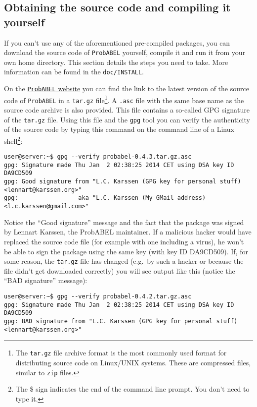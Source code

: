 \documentclass[12pt,a4paper]{article}
\newcommand{\PA}{\texttt{ProbABEL}}
\begin{document}
\subsection{Obtaining the source code and compiling it yourself}
\label{sec:obtain}
If you can't use any of the aforementioned pre-compiled packages, you
can download the source code of \PA{} yourself, compile it and run it
from your own home directory. This section details the steps you need
to take. More information can be found in the \texttt{doc/INSTALL}.

On the \href{http://www.genabel.org/packages/probabel}{\PA{} website}
you can find the link to the latest version of the source code of \PA{}
in a \texttt{tar.gz} file\footnote{The \texttt{tar.gz} file archive
  format is the most commonly used format for distributing source code
  on Linux/UNIX systems. These are compressed files, similar to
  \texttt{zip} files.}. A \texttt{.asc} file with the same base name
as the source code archive is also provided. This file contains a
so-called GPG signature of the \texttt{tar.gz} file. Using this file
and the \texttt{gpg} tool you can verify the authenticity of the
source code by typing this command on the command line of a Linux
shell\footnote{The \$ sign indicates the end of the command line
  prompt. You don't need to type it.}:
\begin{lstlisting}[basicstyle=\scriptsize\ttfamily]
user@server:~$ gpg --verify probabel-0.4.3.tar.gz.asc
gpg: Signature made Thu Jan  2 02:38:25 2014 CET using DSA key ID DA9CD509
gpg: Good signature from "L.C. Karssen (GPG key for personal stuff) <lennart@karssen.org>"
gpg:                 aka "L.C. Karssen (My GMail address) <l.c.karssen@gmail.com>"
\end{lstlisting}
Notice the ``Good signature'' message and the fact that the package was
signed by Lennart Karssen, the ProbABEL maintainer. If a malicious
hacker would have replaced the source code file (for example with one
including a virus), he won't be able to sign the package using the
same key (with key ID DA9CD509). If, for some reason, the
\texttt{tar.gz} file has changed (e.g.~by such a hacker or because
the file didn't get downloaded correctly) you will see output like
this (notice the ``BAD signature'' message):
\begin{lstlisting}[basicstyle=\scriptsize\ttfamily]
user@server:~$ gpg --verify probabel-0.4.2.tar.gz.asc
gpg: Signature made Thu Jan  2 02:38:25 2014 CET using DSA key ID DA9CD509
gpg: BAD signature from "L.C. Karssen (GPG key for personal stuff) <lennart@karssen.org>"
\end{lstlisting}
\end{document}
